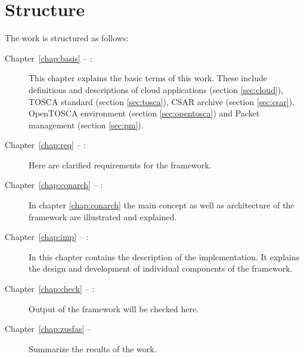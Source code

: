 \section*{Structure}
The work is structured as follows:
\begin{description}
\item[Chapter~\ref{chap:basis} -- :] This chapter explains the basic terms of this work. These include definitions and descriptions of cloud applications (section \ref{sec:cloud}), TOSCA standard (section \ref{sec:tosca}), CSAR archive (section \ref{sec:csar}), OpenTOSCA environment  (section \ref{sec:opentosca}) and Packet management (section \ref{sec:pm}).
\item[Chapter~\ref{chap:req} -- :] Here are clarified requirements for the framework.
\item[Chapter~\ref{chap:conarch} -- :] In chapter \ref{chap:conarch} the main concept as well as architecture of the framework are illustrated and explained.
\item[Chapter~\ref{chap:imp} -- :] In this chapter contains the description of the implementation. It explains the design and development of individual components of the framework. 
\item[Chapter~\ref{chap:check} -- :] Output of the framework will be checked here.
\item[Chapter~\ref{chap:zusfas} -- ] Summarize the results of the work.
\end{description}
